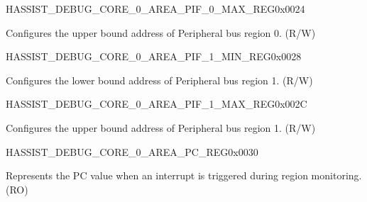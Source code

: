 \begin{register}{H}{ASSIST\_DEBUG\_CORE\_0\_AREA\_PIF\_0\_MAX\_REG}{0x0024}\label{regdesc:ASSISTDEBUGCORE0AREAPIF0MAXREG}
%
\regnewline%
\begin{regdesc}\begin{reglist}
\label{fielddesc:ASSISTDEBUGCORE0AREAPIF0MAX}\item [ASSIST\_DEBUG\_CORE\_0\_AREA\_PIF\_0\_MAX] Configures the upper bound address of Peripheral bus region 0. (R/W)
\end{reglist}\end{regdesc}
\end{register}


\begin{register}{H}{ASSIST\_DEBUG\_CORE\_0\_AREA\_PIF\_1\_MIN\_REG}{0x0028}\label{regdesc:ASSISTDEBUGCORE0AREAPIF1MINREG}
%
\regnewline%
\begin{regdesc}\begin{reglist}
\label{fielddesc:ASSISTDEBUGCORE0AREAPIF1MIN}\item [ASSIST\_DEBUG\_CORE\_0\_AREA\_PIF\_1\_MIN] Configures the lower bound address of Peripheral bus region 1. (R/W)
\end{reglist}\end{regdesc}
\end{register}


\begin{register}{H}{ASSIST\_DEBUG\_CORE\_0\_AREA\_PIF\_1\_MAX\_REG}{0x002C}\label{regdesc:ASSISTDEBUGCORE0AREAPIF1MAXREG}
%
\regnewline%
\begin{regdesc}\begin{reglist}
\label{fielddesc:ASSISTDEBUGCORE0AREAPIF1MAX}\item [ASSIST\_DEBUG\_CORE\_0\_AREA\_PIF\_1\_MAX] Configures the upper bound address of Peripheral bus region 1. (R/W)
\end{reglist}\end{regdesc}
\end{register}


\begin{register}{H}{ASSIST\_DEBUG\_CORE\_0\_AREA\_PC\_REG}{0x0030}\label{regdesc:ASSISTDEBUGCORE0AREAPCREG}
%
\regnewline%
\begin{regdesc}\begin{reglist}
\label{fielddesc:ASSISTDEBUGCORE0AREAPC}\item [ASSIST\_DEBUG\_CORE\_0\_AREA\_PC] Represents the PC value when an interrupt is triggered during region monitoring. (RO)
\end{reglist}\end{regdesc}
\end{register}


